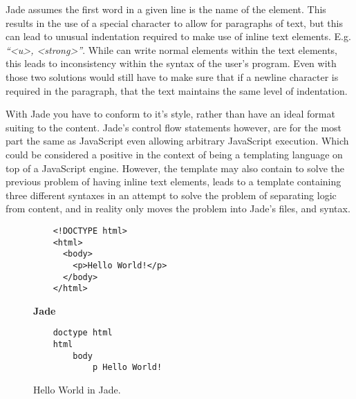 Jade assumes the first word in a given line is the name of the element. This results in the use of a special character to allow for paragraphs of text, but this can lead to unusual indentation required to make use of inline text elements. E.g. \textit{``<u>, <strong>''}. While \you{} can write normal  elements within the text elements, this leads to inconsistency within the syntax of the user's program. Even with those two solutions \you{} would still have to make sure that if a newline character is required in the paragraph, that the text maintains the same level of indentation.

With Jade you have to conform to it's style, rather than have an ideal format suiting to the content. Jade's control flow statements however, are for the most part the same as JavaScript even allowing arbitrary JavaScript execution. Which could be considered a positive in the context of being a templating language on top of a JavaScript engine. However, the template may also contain  to solve the previous problem of having inline text elements, leads to a template containing three different syntaxes in an attempt to solve the problem of separating logic from content, and in reality only moves the problem into Jade's files, and syntax.

\begin{figure}[!htbp]
    \Large{\textbf{}}\normalsize{}
    \begin{verbatim}
    <!DOCTYPE html>
    <html>
      <body>
        <p>Hello World!</p>
      </body>
    </html>
    \end{verbatim}
    \Large{\textbf{Jade}}\normalsize{}
    \begin{verbatim}
    doctype html
    html
        body
            p Hello World!
    \end{verbatim}
    \caption{Hello World in Jade.}
    \label{fig:JadeHelloWorld}
\end{figure}

